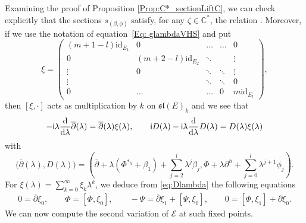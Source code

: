 \documentclass[pdftex]{sigma}
\numberwithin{equation}{section}
\theoremstyle{definition}
\newcommand\C{{\mathbb C}}
\renewcommand{\i}{\mathsf{i}}
\begin{document}
Examining the proof of Proposition \ref{Prop:C*_sectionLiftC}, we can check explicitly that the sections $s_{(\beta,\phi)}$ satisfy,
for any $\zeta \in \C^*$, the relation
.
Moreover, if we use the notation of equation~\eqref{Eq: glambdaVHS} and put
\[%
\xi = \begin{pmatrix}
(m+1-l)\mathrm{id}_{E_1} & 0 &\dots & \dots & 0\\
0 & (m+2-l)\mathrm{id}_{E_2} & \ddots & & \vdots\\
\vdots &0& \ddots & \ddots & \vdots\\
\vdots & & \ddots &\ddots & 0\\
0 & \dots & \dots & 0 & m\mathrm{id}_{E_l}
\end{pmatrix},
\]
then $[\xi, \cdot]$ acts as multiplication by $k$ on $\mathfrak{sl}(E)_k$ and we see that
\begin{equation}\label{eq:Dlambda}
-\i\lambda\frac{\rm d}{{\rm d}\lambda}\overline{\partial}(\lambda) = \overline{\partial}(\lambda)\xi(\lambda),\qquad
\i D(\lambda) - \i\lambda\frac{\rm d}{{\rm d}\lambda}D(\lambda)= D(\lambda)\xi(\lambda)
\end{equation}
with
\[\bigl(\overline{\partial}(\lambda), D(\lambda)\bigr) =
\left({\overline{\partial}} + \lambda(\Phi^{*_h}+\beta_1) + \sum_{j=2}^l\lambda^j\beta_j, \Phi + \lambda\partial^h + \sum_{j=0}^l\lambda^{j+1}\phi_j\right).\]
For $\xi(\lambda) = \sum_{k = 0}^\infty \xi_k \lambda^k$, we deduce from \eqref{eq:Dlambda} the following equations
\begin{gather}\label{eq:PhiPsi}
0 = {\overline{\partial}} \xi_0 ,\qquad \Phi = [\Phi, \xi_0] ,\qquad
-\Psi = {\overline{\partial}} \xi_1 + [\Psi, \xi_0] ,\qquad 0 = [\Phi, \xi_1] + \partial \xi_0.
\end{gather}
We can now compute the second variation of $\mathcal E$ at such fixed points.
\end{document}
